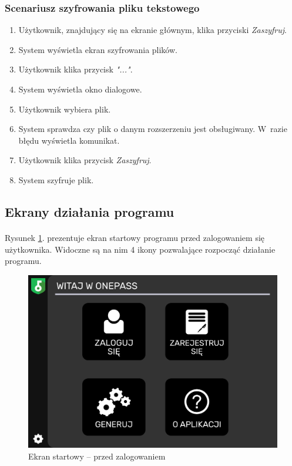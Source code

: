 \documentclass[a4paper]{article}
\begin{document}
\subsubsection{Scenariusz szyfrowania pliku tekstowego}
\begin{enumerate}
    \item Użytkownik, znajdujący się na ekranie głównym, klika przyciski \textit{Zaszyfruj}.
    \item System wyświetla ekran szyfrowania plików.
    \item Użytkownik klika przycisk \textit{"..."}.
    \item System wyświetla okno dialogowe.
    \item Użytkownik wybiera plik.
    \item System sprawdza czy plik o danym rozszerzeniu jest obsługiwany. W~razie błędu wyświetla komunikat.
    \item Użytkownik klika przycisk \textit{Zaszyfruj}.
    \item System szyfruje plik.
\end{enumerate}

\newpage

\subsection{Ekrany działania programu}
\paragraph{}Rysunek \ref{fig:startPrzed}. prezentuje ekran startowy programu przed zalogowaniem się użytkownika. Widoczne są na nim 4 ikony pozwalające rozpocząć działanie programu.
\begin{figure}[H]
    \centering
    \includegraphics[width=1\textwidth]{img/ekran_przed_zalogowaniem.png}
    \caption{Ekran startowy -- przed zalogowaniem}
    \label{fig:startPrzed}
\end{figure}
\end{document}
